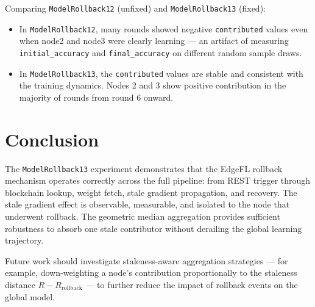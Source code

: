 \documentclass[11pt]{article}
\begin{document}
Comparing \texttt{ModelRollback12} (unfixed) and \texttt{ModelRollback13} (fixed):

\begin{itemize}
    \item In \texttt{ModelRollback12}, many rounds showed negative \texttt{contributed} values even when node2 and node3 were clearly learning — an artifact of measuring \texttt{initial\_accuracy} and \texttt{final\_accuracy} on different random sample draws.
    \item In \texttt{ModelRollback13}, the \texttt{contributed} values are stable and consistent with the training dynamics. Nodes 2 and 3 show positive contribution in the majority of rounds from round 6 onward.
\end{itemize}

\section{Conclusion}

The \texttt{ModelRollback13} experiment demonstrates that the EdgeFL rollback mechanism operates correctly across the full pipeline: from REST trigger through blockchain lookup, weight fetch, stale gradient propagation, and recovery. The stale gradient effect is observable, measurable, and isolated to the node that underwent rollback. The geometric median aggregation provides sufficient robustness to absorb one stale contributor without derailing the global learning trajectory.

Future work should investigate staleness-aware aggregation strategies — for example, down-weighting a node's contribution proportionally to the staleness distance $R - R_{\text{rollback}}$ — to further reduce the impact of rollback events on the global model.
\end{document}
